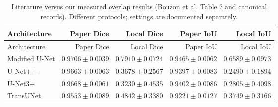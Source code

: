 \small
\begin{longtable}{lrrrr}
\caption{Literature versus our measured overlap results (Bouzon et al. Table 3 and canonical records). Different protocols; settings are documented separately.}\\
\toprule
Architecture & Paper Dice & Local Dice & Paper IoU & Local IoU\\\midrule
\endfirsthead
\toprule
Architecture & Paper Dice & Local Dice & Paper IoU & Local IoU\\\midrule
\endhead
Modified U-Net & $0.9706\pm0.0039$ & $0.7910\pm0.0724$ & $0.9465\pm0.0062$ & $0.6589\pm0.0973$\\
U-Net++ & $0.9663\pm0.0063$ & $0.3678\pm0.2567$ & $0.9397\pm0.0083$ & $0.2490\pm0.1894$\\
U-Net3+ & $0.9668\pm0.0061$ & $0.3230\pm0.4535$ & $0.9402\pm0.0086$ & $0.2805\pm0.4098$\\
TransUNet & $0.9553\pm0.0089$ & $0.4842\pm0.3380$ & $0.9221\pm0.0127$ & $0.3749\pm0.3166$\\
\bottomrule\end{longtable}\normalsize
